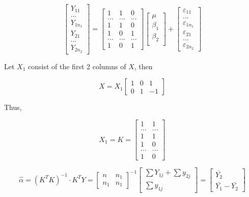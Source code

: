 \documentclass[]{book}
\begin{document}
\[\begin{bmatrix}
Y_{11} \\ ... \\ Y_{1n_1} \\
Y_{21}  \\ ... \\ Y_{2n_2} \end{bmatrix}=
\begin{bmatrix}
1 & 1 & 0\\
... & ... & ... \\
1 & 1 & 0 \\
1 & 0 & 1 \\ 
... & ... & ... \\
1 & 0 &1 \end{bmatrix} 
\begin{bmatrix}
\mu \\
\beta_1  \\
\beta_2\\
\end{bmatrix}+\begin{bmatrix}
\varepsilon_{11} \\ ... \\ \varepsilon_{1n_1} \\
\varepsilon_{21}  \\ ... \\ \varepsilon_{2n_2}  \end{bmatrix}\]

Let \(X_1\) consist of the first 2 columns of \(X\), then

\[X=X_1 \begin{bmatrix}
1 & 0 & 1 \\ 0 & 1 & -1 \end{bmatrix}\]

Thus,

\[X_1=K=\begin{bmatrix}
1 & 1 \\
... & ...  \\
1 & 1 \\
1 & 0  \\ 
... & ... \\
1 & 0  \end{bmatrix} \]

\[\hat{\alpha}=(K^T K)^{-1} \cdot K^TY=\begin{bmatrix}
n & n_1 \\
n_1 & n_1 \end{bmatrix}^{-1} \begin{bmatrix}
\sum Y_{1j}+\sum y_{2j} \\
\sum y_{1j} \end{bmatrix} =\begin{bmatrix}
\bar{Y_2}\\ \bar{Y_1}-\bar{Y_2} \end{bmatrix}\]
\end{document}
